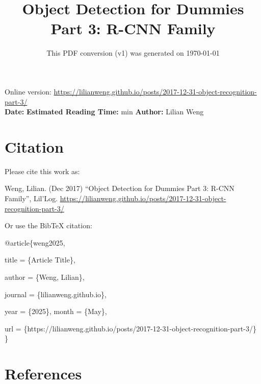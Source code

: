 \documentclass[12pt]{article}
\title{Object Detection for Dummies Part 3: R-CNN Family}
\date{This PDF conversion (v1) was generated on \today\footnotemark}
\begin{document}
\maketitle
\begin{center}
    Online version: \url{https://lilianweng.github.io/posts/2017-12-31-object-recognition-part-3/} \\
    \textbf{Date:} \quad
    \textbf{Estimated Reading Time:}  min \quad
    \textbf{Author:} Lilian Weng
\end{center}




\newpage
\tableofcontents
\newpage
\vspace{1em}
\n\n\n\section{Citation}
Please cite this work as:

\begin{tcolorbox}[colback=black!5!white, colframe=black!80!white, boxrule=0.5pt, arc=2mm, left=1mm, right=1mm, top=1mm, bottom=1mm]
  Weng, Lilian. (Dec 2017) ``Object Detection for Dummies Part 3: R-CNN Family'', Lil'Log. \url{https://lilianweng.github.io/posts/2017-12-31-object-recognition-part-3/}
  \end{tcolorbox}

Or use the BibTeX citation:

\begin{tcolorbox}[
    colback=black!5!white,
    colframe=black!80!white,
    boxrule=0.5pt,
    arc=2mm,
    left=1mm,
    right=1mm,
    top=1mm,
    bottom=1mm,
    listing only,
    listing options={
      basicstyle=\ttfamily\footnotesize,
      breaklines=true,
      literate={\{}{{\char`\{}}1 {\}}{{\char`\}}}1
    }
  ]
  @article\{weng2025,

    title   = \{Article Title\},

    author  = \{Weng, Lilian\},

    journal = \{lilianweng.github.io\},

    year    = \{2025\},
    month   = \{May\},

    url     = \{https://lilianweng.github.io/posts/2017-12-31-object-recognition-part-3/\}\n
  \}
  \end{tcolorbox}

\newpage
\section{References}

\n
\end{document}
